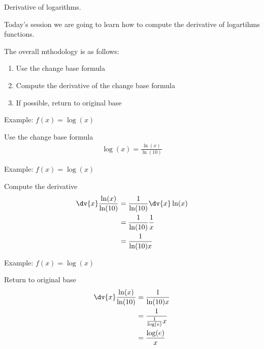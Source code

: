 \documentclass[../tufte-style.tex]{standalone}
\begin{document}
\date{March 4, 2026}


\begin{frame}{Derivative of logarithms.}

    Today's session we are going to learn how to compute the derivative of logartihms functions.

    The overall mthodology is as follows:
    \begin{enumerate}
        \item Use the change base formula
        \item Compute the derivative of the change base formula
        \item If possible, return to original base
    \end{enumerate}

\end{frame}

\begin{frame}{Example: \(f(x) = \log(x)\)}

    \begin{block}{Use the change base formula}
        \begin{gather*}
            \log(x) = \frac{\ln(x)}{\ln(10)}
        \end{gather*}
    \end{block}

\end{frame}

\begin{frame}{Example: \(f(x) = \log(x)\)}

    \begin{block}{Compute the derivative}
        \begin{align*}
            \dv{x}\frac{\ln(x)}{\ln(10)} &= \frac{1}{\ln(10)}\dv{x}\ln(x) \\ 
                                         &= \frac{1}{\ln(10)}\frac{1}{x} \\
                                         &= \frac{1}{\ln(10)x}
        \end{align*}
    \end{block}

\end{frame}

\begin{frame}{Example: \(f(x) = \log(x)\)}

    \begin{block}{Return to original base}
        \begin{align*}
            \dv{x}\frac{\ln(x)}{\ln(10)} &= \frac{1}{\ln(10)x} \\
                                         &= \frac{1}{\frac{1}{\log(e)}x} \\
                                         &= \frac{\log(e)}{x}
        \end{align*}
    \end{block}

\end{frame}
\end{document}
